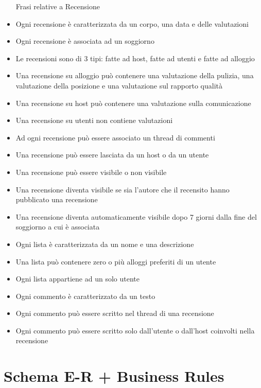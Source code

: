 \documentclass[letterpaper]{report}
\begin{document}
\begin{itemize} Frasi relative a Recensione
\item Ogni recensione è caratterizzata da un corpo, una data e delle valutazioni
\item Ogni recensione è associata ad un soggiorno
\item Le recensioni sono di 3 tipi: fatte ad host, fatte ad utenti e fatte ad alloggio
\item Una recensione su alloggio può contenere una valutazione della pulizia, una valutazione della posizione e una valutazione sul rapporto qualità\itemprezzo
\item Una recensione su host può contenere una valutazione sulla comunicazione
\item Una recensione su utenti non contiene valutazioni
\item Ad ogni recensione può essere associato un thread di commenti
\item Una recensione può essere lasciata da un host o da un utente
\item Una recensione può essere visibile o non visibile
\item Una recensione diventa visibile se sia l'autore che il recensito hanno pubblicato una recensione
\item Una recensione diventa automaticamente visibile dopo 7 giorni dalla fine del soggiorno a cui è associata
\end{itemize}

\begin{itemize} Frasi relative a Liste
\item Ogni lista è caratterizzata da un nome e una descrizione
\item Una lista può contenere zero o più alloggi preferiti di un utente
\item Ogni lista appartiene ad un solo utente
\end{itemize}

\begin{itemize} Frasi relative a Commento
\item Ogni commento è caratterizzato da un testo
\item Ogni commento può essere scritto nel thread di una recensione
\item Ogni commento può essere scritto solo dall'utente o dall'host coinvolti nella recensione
\end{itemize}


\section{Schema E-R + Business Rules}
\end{document}
